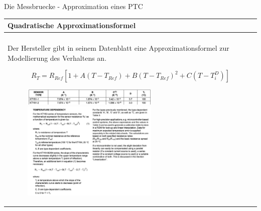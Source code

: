 \begin{frame}[t]{Die Messbruecke - Approximation eines PTC}

    \begin{spacing}{0.9} \begin{tiny}
            \begin{table}[h!]
                \begin{tabular}{p{10cm}}
                    \hline
                    \textbf{Quadratische Approximationsformel} \\
                    \hline                                     \\
                    \begin{minipage}{\textwidth}
                        Der Hersteller gibt in seinem Datenblatt eine Approximationsformel zur Modellierung des Verhaltens an.

                        \begin{equation}
                            R_T=R_{Ref}[1+A(T-T_{Ref})+B(T-T_{Ref})^2+C(T-T_{i}^D)]
                        \end{equation}
                        \begin{figure}
                            \centering
                            \includegraphics[width=0.6\textwidth]{pictures/kty81_constants.png}
                            \includegraphics[width=0.6\textwidth]{pictures/kty81_formula.png}
                        \end{figure}
                    \end{minipage}
                \end{tabular}

            \end{table}

        \end{tiny} \end{spacing}

\end{frame}

